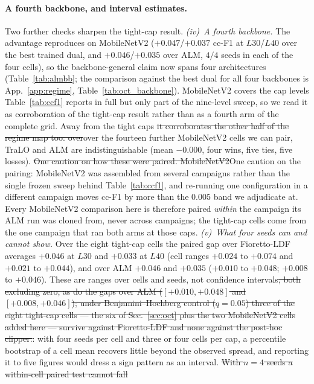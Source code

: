 \documentclass[10pt]{article}
\newcommand{\del}[1]{{\color{red}\sout{#1}}}
\begin{document}
{\color{blue}
\paragraph{A fourth backbone, and interval estimates.}
Two further checks sharpen the tight-cap result. \emph{(iv)~A fourth
backbone.} The advantage reproduces on MobileNetV2 ($+0.047$/$+0.037$ cc-F1 at
$L30$/$L40$ over the best trained dual, and $+0.046$/$+0.035$ over ALM, $4/4$
seeds in each of the four cells), so the backbone-general claim now spans four
architectures (Table~\ref{tab:almbb}; the comparison against the best dual for
all four backbones is App.~\ref{app:regime},
Table~\ref{tab:oct_backbone}). MobileNetV2 covers the cap levels
Table~\ref{tab:ccf1} reports in full but only part of the nine-level sweep, so we
read it as corroboration of the tight-cap result rather than as a fourth arm of
the complete grid. Away from the tight caps \del{it corroborates the other half of the
regime map too: over}{over} the fourteen further MobileNetV2 cells we can pair, TraLO
and ALM are indistinguishable (mean $-0.000$, four wins, five ties, five losses).
\del{One caution on how these were paired. MobileNetV2}{One caution on the pairing: MobileNetV2} was assembled from several
campaigns rather than the single frozen sweep behind
Table~\ref{tab:ccf1}, and re-running one configuration in a different campaign
moves cc-F1 by more than the $0.005$ band we adjudicate at. Every MobileNetV2
comparison here is therefore paired \emph{within} the campaign its ALM run was
cloned from, never across campaigns; the tight-cap cells come from the one
campaign that ran both arms at those caps. \emph{(v)~What four seeds can and
cannot show.} Over the eight tight-cap cells the paired gap over Fioretto-LDF
averages $+0.046$ at $L30$ and $+0.033$ at $L40$ (cell ranges $+0.024$ to
$+0.074$ and $+0.021$ to $+0.044$), and over ALM $+0.046$ and $+0.035$ ($+0.010$
to $+0.048$; $+0.008$ to $+0.046$). These are ranges over cells and seeds, not
confidence intervals\del{, both excluding zero, as do the gaps over ALM
($[{+}0.010,{+}0.048]$ and $[{+}0.008,{+}0.046]$); under Benjamini--Hochberg control
($q{=}0.05$) three of the eight tight-cap cells --- the six of Sec.~\ref{sec:oct} plus the
two MobileNetV2 cells added here --- survive against Fioretto-LDF and none
against the post-hoc clipper.}{\color{blue}: with four seeds per cell and three or
four cells per cap, a percentile bootstrap of a cell mean recovers little beyond
the observed spread, and reporting it to five figures would dress a sign pattern
as an interval.} \del{With \mbox{$n{=}4$} seeds a within-cell paired test cannot fall
}}
\end{document}
